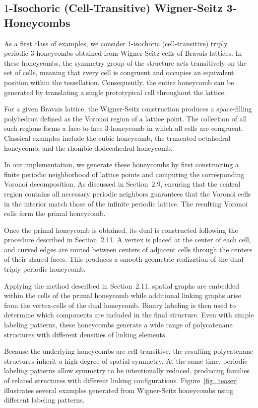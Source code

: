 \documentclass[times,twocolumn,final]{elsarticle}
\begin{document}
\subsection{$1$-Isochoric (Cell-Transitive) Wigner-Seitz 3-Honeycombs}


As a first class of examples, we consider 1-isochoric (cell-transitive)
triply periodic 3-honeycombs obtained from Wigner-Seitz cells of
Bravais lattices. In these honeycombs, the symmetry group of the
structure acts transitively on the set of cells, meaning that every
cell is congruent and occupies an equivalent position within the
tessellation. Consequently, the entire honeycomb can be generated by
translating a single prototypical cell throughout the lattice.

For a given Bravais lattice, the Wigner-Seitz construction produces a space-filling polyhedron defined as the Voronoi region of a lattice point. The collection of all such regions forms a face-to-face 3-honeycomb in which all cells are congruent. Classical examples include the cubic honeycomb, the truncated octahedral honeycomb, and the rhombic dodecahedral honeycomb.

In our implementation, we generate these honeycombs by first
constructing a finite periodic neighborhood of lattice points and
computing the corresponding Voronoi decomposition. As discussed in
Section~2.9, ensuring that the central region contains all necessary
periodic neighbors guarantees that the Voronoi cells in the interior
match those of the infinite periodic lattice. The resulting Voronoi
cells form the primal honeycomb.

Once the primal honeycomb is obtained, its dual is constructed
following the procedure described in Section~2.11. A vertex is placed
at the center of each cell, and curved edges are routed between
centers of adjacent cells through the centers of their shared faces.
This produces a smooth geometric realization of the dual triply
periodic honeycomb.

Applying the method described in Section~2.11, spatial graphs are embedded within the cells of the primal honeycomb while additional linking graphs arise from the vertex-cells of the dual honeycomb. Binary labeling is then used to determine which components are included in the final structure. Even with simple labeling patterns, these honeycombs generate a wide range of polycatenane structures with different densities of linking elements.

Because the underlying honeycombs are cell-transitive, the resulting
polycatenane structures inherit a high degree of spatial symmetry.
At the same time, periodic labeling patterns allow symmetry to be intentionally reduced, producing families of related structures with different linking configurations. Figure~\ref{fig_teaser} illustrates several examples generated from Wigner-Seitz honeycombs using different labeling patterns.
\end{document}
